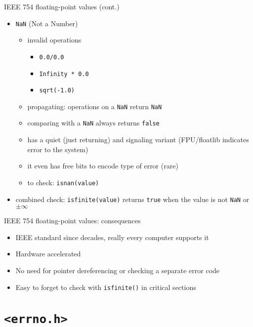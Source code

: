 \documentclass[aspectratio=169,14pt]{beamer}
\begin{document}
\begin{frame}{IEEE 754 floating-point values (cont.)}
\begin{itemize}
    \item \texttt{NaN} (Not a Number)
    \begin{itemize}
        \item invalid operations
        \begin{itemize}
            \item \texttt{0.0/0.0}
            \item \texttt{Infinity * 0.0}
            \item \texttt{sqrt(-1.0)}
        \end{itemize}
        \item propagating: operations on a \texttt{NaN} return \texttt{NaN}
        \item comparing with a \texttt{NaN} always returns \texttt{false}
        \item has a quiet (just returning) and signaling variant (FPU/floatlib indicates error to the system)
        \item it even has free bits to encode type of error (rare)
        \item to check: \texttt{isnan(value)}
    \end{itemize}
    \item combined check: \texttt{isfinite(value)} returns \texttt{true} when the value is not \texttt{NaN} or \( \pm \infty \)
\end{itemize}
\end{frame}



\begin{frame}{IEEE 754 floating-point values: consequences}
\begin{itemize}
    \item[\good] IEEE standard since decades, really every computer supports it
    \item[\good] Hardware accelerated
    \item[\good] No need for pointer dereferencing or checking a separate error code
    \item[\bad] Easy to forget to check with \texttt{isfinite()} in critical sections
\end{itemize}
\end{frame}





\section{\texttt{<errno.h>}}
\end{document}
